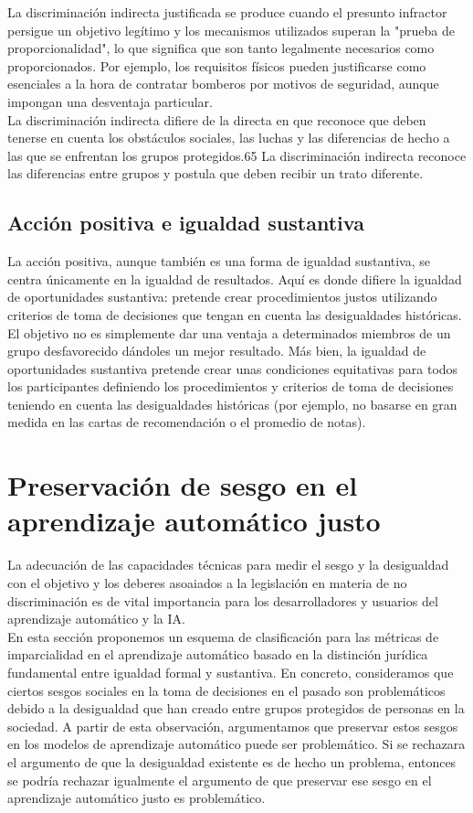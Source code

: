 La discriminación indirecta justificada se produce cuando el presunto infractor persigue un objetivo legítimo y los mecanismos utilizados superan la "prueba de proporcionalidad", lo que significa que son tanto legalmente necesarios como proporcionados. Por ejemplo, los requisitos físicos pueden justificarse como esenciales a la hora de contratar bomberos por motivos de seguridad, aunque impongan una desventaja particular.\\

La discriminación indirecta difiere de la directa en que reconoce que deben tenerse en cuenta los obstáculos sociales, las luchas y las diferencias de hecho a las que se enfrentan los grupos protegidos.65 La discriminación indirecta reconoce las diferencias entre grupos y postula que deben recibir un trato diferente.

\subsection{Acción positiva e igualdad sustantiva}
La acción positiva, aunque también es una forma de igualdad sustantiva, se centra únicamente en la igualdad de resultados. Aquí es donde difiere la igualdad de oportunidades sustantiva: pretende crear procedimientos justos utilizando criterios de toma de decisiones que tengan en cuenta las desigualdades históricas. El objetivo no es simplemente dar una ventaja a determinados miembros de un grupo desfavorecido dándoles un mejor resultado. Más bien, la igualdad de oportunidades sustantiva pretende crear unas condiciones equitativas para todos los participantes definiendo los procedimientos y criterios de toma de decisiones teniendo en cuenta las desigualdades históricas (por ejemplo, no basarse en gran medida en las cartas de recomendación o el promedio de notas).


\section{Preservación de sesgo en el aprendizaje automático justo}
La adecuación de las capacidades técnicas para medir el sesgo y la desigualdad con el objetivo y los deberes asoaiados a la legislación en materia de no discriminación es de vital importancia para los desarrolladores y usuarios del aprendizaje automático y la IA.\\

En esta sección proponemos un esquema de clasificación para las métricas de imparcialidad en el aprendizaje automático basado en la distinción jurídica fundamental entre igualdad formal y sustantiva. En concreto, consideramos que ciertos sesgos sociales en la toma de decisiones en el pasado son problemáticos debido a la desigualdad que han creado entre grupos protegidos de personas en la sociedad. A partir de esta observación, argumentamos que preservar estos sesgos en los modelos de aprendizaje automático puede ser problemático. Si se rechazara el argumento de que la desigualdad existente es de hecho un problema, entonces se podría rechazar igualmente el argumento de que preservar ese sesgo en el aprendizaje automático justo es problemático.

